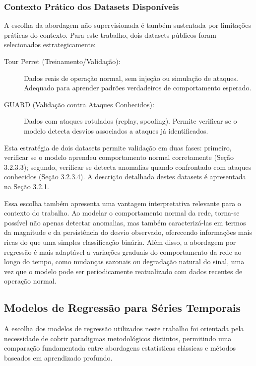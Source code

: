 \subsubsection{Contexto Prático dos Datasets Disponíveis}

A escolha da abordagem não supervisionada é também sustentada por 
limitações práticas do contexto. Para este trabalho, dois datasets 
públicos foram selecionados estrategicamente:

\begin{description}
    \item[Tour Perret (Treinamento/Validação):] Dados reais de operação 
    normal, sem injeção ou simulação de ataques. Adequado para aprender 
    padrões verdadeiros de comportamento esperado.
    
    \item[GUARD (Validação contra Ataques Conhecidos):] Dados com ataques 
    rotulados (replay, spoofing). Permite verificar se o modelo detecta 
    desvios associados a ataques já identificados.
\end{description}

Esta estratégia de dois datasets permite validação em duas fases: 
primeiro, verificar se o modelo aprendeu comportamento normal 
corretamente (Seção 3.2.3.3); segundo, verificar se detecta anomalias 
quando confrontado com ataques conhecidos (Seção 3.2.3.4). A descrição 
detalhada destes datasets é apresentada na Seção 3.2.1.


Essa escolha também apresenta uma vantagem interpretativa relevante para o 
contexto do trabalho. Ao modelar o comportamento normal da rede, torna-se 
possível não apenas detectar anomalias, mas também caracterizá-las em termos 
da magnitude e da persistência do desvio observado, oferecendo informações 
mais ricas do que uma simples classificação binária. Além disso, a abordagem 
por regressão é mais adaptável a variações graduais do comportamento da rede 
ao longo do tempo, como mudanças sazonais ou degradação natural do sinal, 
uma vez que o modelo pode ser periodicamente reatualizado com dados recentes 
de operação normal.


\subsection{Modelos de Regressão para Séries Temporais}

A escolha dos modelos de regressão utilizados neste trabalho foi orientada 
pela necessidade de cobrir paradigmas metodológicos distintos, permitindo 
uma comparação fundamentada entre abordagens estatísticas clássicas e 
métodos baseados em aprendizado profundo. 

